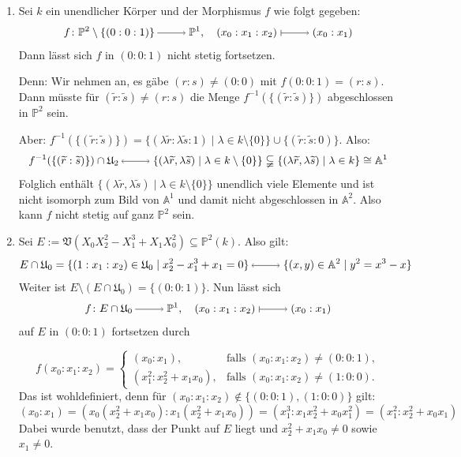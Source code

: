 \documentclass[a4paper,12pt,index=toc]{scrbook}
\theoremstyle{keinenummern} %
\def\A{\mathbb{A}}
\def\V{\mathfrak{V}}
\def\P{\mathbb{P}}
\def\U{\mathfrak{U}}
\newcommand{\schlange}[1]{\widetilde{#1}}
\begin{document}
\begin{bsp}\label{2.6.3}
\begin{enumerate}
  \item{} Sei $k$ ein unendlicher Körper und der Morphismus $f$ wie folgt gegeben:
\begin{equation*}f\colon \P^2\setminus \{(0:0:1)\}\ra \P^1, \quad (x_0:x_1:x_2)\mapsto (x_0:x_1)\end{equation*}
Dann lässt sich $f$ in $(0:0:1)$ nicht stetig fortsetzen.

Denn: Wir nehmen an, es gäbe  $(r:s)\neq (0:0)$ mit $f(0:0:1)=(r:s)$. Dann müsste für $(\schlange{r}:\schlange{s})\neq (r:s)$ die Menge $f^{-1}(\{(\schlange{r}:\schlange{s})\})$ abgeschlossen in $\P^2$ sein.

Aber: $f^{-1}(\{(\schlange{r}:\schlange{s})\})=\{(\lambda \schlange{r}:\lambda \schlange{s}:1) \mid \lambda \in k\setminus \{0\}\}\cup\{(\schlange{r}:\schlange{s}:0)\}$. Also:
\begin{equation*}f^{-1}(\{(\schlange{r}:\schlange{s})\})\cap\U_2 \lra \{(\lambda \schlange{r},\lambda \schlange{s}) \mid \lambda \in k\setminus \{0\}\} \subsetneqq \{(\lambda \schlange{r},\lambda \schlange{s}) \mid \lambda \in k\} \cong \A^1\end{equation*}
Folglich enthält $\{(\lambda \schlange{r}, \lambda \schlange{s}) \mid \lambda \in k\setminus \{0\}\}$ unendlich viele Elemente und ist nicht isomorph zum Bild von $\A^1$ und damit nicht abgeschlossen in $\A^2$. Also kann $f$ nicht stetig auf ganz $\P^2$ sein.
  \item{} Sei $E:=\V(X_0X_2^2-X_1^3+X_1X_0^{2}) \subseteq \P^2(k)$. Also gilt: 
  \begin{equation*}E\cap \U_0=\{(1:x_1:x_2) \in \U_0 \mid x_2^2-x_1^3+x_1=0\} \lra \{(x,y)\in \A^2 \mid y^2=x^3-x\}\end{equation*}
Weiter ist $E\setminus (E\cap \U_0)=\{(0:0:1)\}$. Nun lässt sich 
\begin{equation*}f \colon E\cap\U_0\ra \P^1, \quad (x_0:x_1:x_2)\mapsto (x_0:x_1)\end{equation*} auf $E$ in $(0:0:1)$ fortsetzen durch 

\begin{equation*}f(x_0:x_1:x_2)=\begin{cases} (x_0:x_1),&\text{falls } (x_0:x_1:x_2)\neq (0:0:1),\\ (x_1^2:x_2^2+x_1x_0),&\text{falls } (x_0:x_1:x_2)\neq (1:0:0). \end{cases}\end{equation*} 
Das ist wohldefiniert, denn für $(x_0:x_1:x_2) \notin \{(0:0:1),(1:0:0)\}$ gilt:
\begin{equation*}(x_0:x_1)=(x_0(x_2^2+x_1x_0):x_1(x_2^2+x_1x_0))=(x_1^3:x_1x_2^2+x_0x_1^2)=(x_1^2:x_2^2+x_0x_1)\end{equation*}
Dabei wurde benutzt, dass der Punkt auf $E$ liegt und $x_2^2+x_1x_0 \neq 0$ sowie $x_1 \neq 0$.


\end{enumerate}
\end{bsp}
\end{document}
